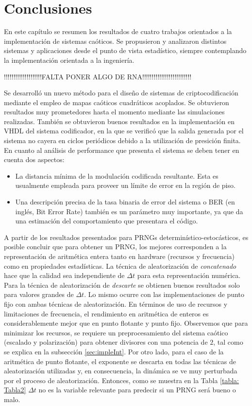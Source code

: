 \section{Conclusiones}

En este capítulo se resumen los resultados de cuatro trabajos orientados a la implementación de sistemas caóticos.
Se propusieron y analizaron distintos sistemas y aplicaciones desde el punto de vista estadístico, siempre contemplando la implementación orientada a la ingeniería.

!!!!!!!!!!!!!!!!!!!!FALTA PONER ALGO DE RNA!!!!!!!!!!!!!!!!!!!!!!!!!!

Se desarrolló un nuevo método para el diseño de sistemas de criptocodificación mediante el empleo de mapas caóticos cuadráticos acoplados.
Se obtuvieron resultados muy prometedores hasta el momento mediante las simulaciones realizadas.
También se obtuvieron buenos resultados en la implementación en VHDL del sistema codificador, en la que se verificó que la salida generada por el sistema no cayera en ciclos periódicos debido a la utilización de presición finita.
En cuanto al análisis de performance que presenta el sistema se deben tener en cuenta dos aspectos:
\begin{itemize}
	\item
	La distancia mínima de la modulación codificada resultante.
	Esta  es usualmente empleada para proveer un límite de error en la región de piso.
	\item
	Una descripción precisa de la tasa binaria de error del sistema o BER (en inglés, Bit Error Rate) también es un parámetro muy importante, ya que da una estimación del comportamiento que presentara el código.
\end{itemize}

A partir de los resultados presentados para PRNGs determinístico-estocásticos, es posible concluir que para obtener un PRNG, los mejores corresponden a la representación de aritmética entera tanto en hardware (recursos y frecuencia) como en propiedades estadísticas.
La técnica de aleatorización de \textit{concatenado} hace que la calidad sea independiente de $\Delta t$ para esta representación numérica.
Para la técnica de aleatorización de \textit{descarte} se obtienen buenos resultados solo para valores grandes de $\Delta t$.
Lo mismo ocurre con las implementaciones de punto fijo con ambas técnicas de aleatorización.
En términos de uso de recursos y limitaciones de frecuencia, el rendimiento en aritmética de enteros es considerablemente mejor que en punto flotante y punto fijo.
Observemos que para minimizar los recursos, se requiere un preprocesamiento del sistema caótico (escalado y polarización) para obtener divisores con una potencia de $2$, tal como se explica en la subsección \ref{sec:impleInt}.
Por otro lado, para el caso de la aritmética de punto flotante, el exponente se descarta en todas las técnicas de aleatorización utilizadas y, en consecuencia, la dinámica se ve muy perturbada por el proceso de aleatorización.
Entonces, como se muestra en la Tabla \ref{tabla: Tabla2} $\Delta t $ no es la variable relevante para predecir si un PRNG será bueno o malo.

